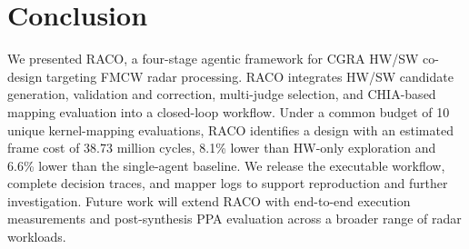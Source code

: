 \documentclass[conference,letterpaper]{IEEEtran}
\begin{document}
\section{Conclusion}

We presented RACO, a four-stage agentic framework for CGRA HW/SW co-design targeting FMCW radar processing. RACO integrates HW/SW candidate generation, validation and correction, multi-judge selection, and CHIA-based mapping evaluation into a closed-loop workflow. Under a common budget of 10 unique kernel-mapping evaluations, RACO identifies a design with an estimated frame cost of 38.73 million cycles, 8.1\% lower than HW-only exploration and 6.6\% lower than the single-agent baseline. We release the executable workflow, complete decision traces, and mapper logs to support reproduction and further investigation. Future work will extend RACO with end-to-end execution measurements and post-synthesis PPA evaluation across a broader range of radar workloads.






\end{document}
